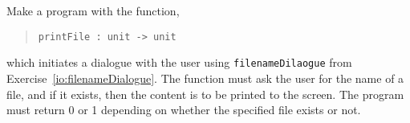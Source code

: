 Make a program with the function,
\begin{quote}
  \mbox{\lstinline!printFile : unit -> unit!}
\end{quote}
which initiates a dialogue with the user using
\lstinline{filenameDilaogue} from
Exercise~\ref{io:filenameDialogue}. The function must ask the user for
the name of a file, and if it exists, then the content is to be
printed to the screen. The program must return 0 or 1 depending on
whether the specified file exists or not.
